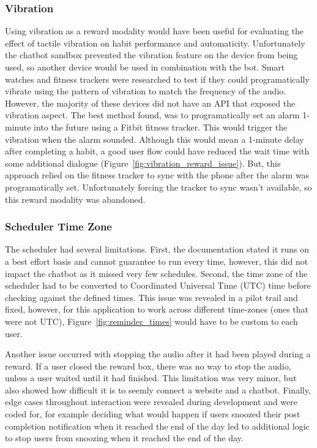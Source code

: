 \subsubsection*{Vibration}
Using vibration as a reward modality would have been useful for evaluating the effect of tactile vibration on habit performance and automaticity. Unfortunately the chatbot sandbox prevented the vibration feature on the device from being used, so another device would be used in combination with the bot.
Smart watches and fitness trackers were researched to test if they could programatically vibrate using the pattern of vibration to match the frequency of the audio.
However, the majority of these devices did not have an API that exposed the vibration aspect. The best method found, was to programatically set an alarm 1-minute into the future using a Fitbit fitness tracker.
This would trigger the vibration when the alarm sounded.
Although this would mean a 1-minute delay after completing a habit, a good user flow could have reduced the wait time with some additional dialogue (Figure~\ref{fig:vibration_reward_issue}).
But, this approach relied on the fitness tracker to sync with the phone after the alarm was programatically set. Unfortunately forcing the tracker to sync wasn't available, so this reward modality was abandoned.

\subsubsection*{Scheduler Time Zone}
The scheduler had several limitations. First, the documentation stated it runs on a best effort basis and cannot guarantee to run every time, however, this did not impact the chatbot as it missed very few schedules. Second, the time zone of the scheduler had to be converted to Coordinated Universal Time (UTC) time before checking against the defined times. This issue was revealed in a pilot trail and fixed, however, for this application to work across different time-zones (ones that were not UTC), Figure~\ref{fig:reminder_times} would have to be custom to each user.


Another issue occurred with stopping the audio after it had been played during a reward. If a user closed the reward box, there was no way to stop the audio, unless a user waited until it had finished. This limitation was very minor, but also showed how difficult it is to seemly connect a website and a chatbot. Finally, edge cases throughout interaction were revealed during development and were coded for, for example deciding what would happen if users snoozed their post completion notification when it reached the end of the day led to additional logic to stop users from snoozing when it reached the end of the day.
\newpage
